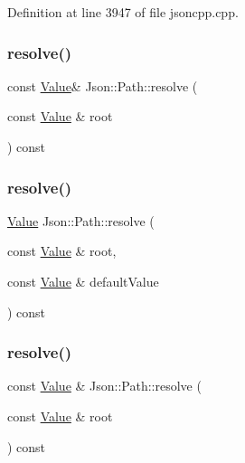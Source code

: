 Definition at line 3947 of file jsoncpp.\+cpp.

\hypertarget{class_json_1_1_path_a3008d26b00e4322cd56dfc5d84ef2cfa}{}\label{class_json_1_1_path_a3008d26b00e4322cd56dfc5d84ef2cfa} 
\subsubsection{\texorpdfstring{resolve()}{resolve()}\hspace{0.1cm}{\footnotesize\ttfamily [1/4]}}
{\footnotesize\ttfamily const \hyperlink{class_json_1_1_value}{Value}\& Json\+::\+Path\+::resolve (\begin{DoxyParamCaption}\item[{const \hyperlink{class_json_1_1_value}{Value} \&}]{root }\end{DoxyParamCaption}) const}

\hypertarget{class_json_1_1_path_ab65ab001ccdbc6f8b5f123da58b92539}{}\label{class_json_1_1_path_ab65ab001ccdbc6f8b5f123da58b92539} 
\subsubsection{\texorpdfstring{resolve()}{resolve()}\hspace{0.1cm}{\footnotesize\ttfamily [2/4]}}
{\footnotesize\ttfamily \hyperlink{class_json_1_1_value}{Value} Json\+::\+Path\+::resolve (\begin{DoxyParamCaption}\item[{const \hyperlink{class_json_1_1_value}{Value} \&}]{root,  }\item[{const \hyperlink{class_json_1_1_value}{Value} \&}]{default\+Value }\end{DoxyParamCaption}) const}

\hypertarget{class_json_1_1_path_ad1abdc54d2e03fc0e9436c3b9fd55a33}{}\label{class_json_1_1_path_ad1abdc54d2e03fc0e9436c3b9fd55a33} 
\subsubsection{\texorpdfstring{resolve()}{resolve()}\hspace{0.1cm}{\footnotesize\ttfamily [3/4]}}
{\footnotesize\ttfamily const \hyperlink{class_json_1_1_value}{Value} \& Json\+::\+Path\+::resolve (\begin{DoxyParamCaption}\item[{const \hyperlink{class_json_1_1_value}{Value} \&}]{root }\end{DoxyParamCaption}) const}



